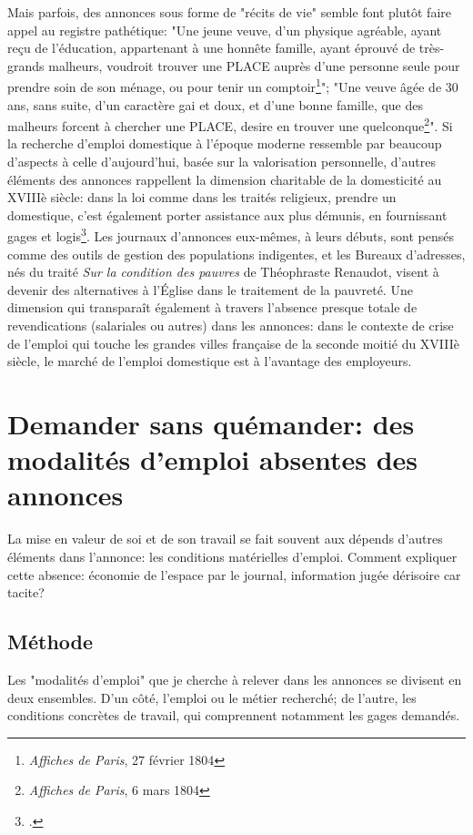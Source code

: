 {Mais parfois, des  annonces sous forme de "récits de vie" semble font plutôt faire appel au registre pathétique:  "Une jeune veuve, d'un physique agréable, ayant reçu de l'éducation, appartenant à une honnête famille, ayant éprouvé de très-grands malheurs, voudroit trouver une PLACE auprès d'une personne seule pour prendre soin de son ménage, ou pour tenir un comptoir\footnote{\textit{Affiches de Paris}, 27 février 1804}"; "Une veuve âgée de 30 ans, sans suite, d'un caractère gai et doux, et d'une bonne famille, que des malheurs forcent à chercher une PLACE, desire en trouver une quelconque\footnote{\textit{Affiches de Paris}, 6 mars 1804}". Si la recherche d'emploi domestique à l'époque moderne ressemble par beaucoup d'aspects à celle d'aujourd'hui, basée sur la valorisation personnelle, d'autres éléments des annonces rappellent la dimension charitable de la domesticité au XVIIIè siècle: dans la loi comme dans les traités religieux, prendre un domestique, c'est également porter assistance aux plus démunis, en fournissant gages et logis\footcites{sabattierChapitreMaitrePere1984}. Les journaux d'annonces eux-mêmes, à leurs débuts, sont pensés comme des outils de gestion des populations indigentes, et les Bureaux d'adresses, nés du traité \textit{Sur la condition des pauvres} de Théophraste Renaudot, visent à devenir des alternatives à l'Église dans le traitement de la pauvreté. Une dimension qui transparaît également à travers l'absence presque totale de revendications (salariales ou autres) dans les annonces: dans le contexte de crise de l'emploi qui touche les grandes villes française de la seconde moitié du XVIIIè siècle, le marché de l'emploi domestique est à l'avantage des employeurs.

\chapter{Demander sans quémander: des modalités d'emploi absentes des annonces}

La mise en valeur de soi et de son travail se fait souvent aux dépends d'autres éléments dans l'annonce: les conditions matérielles d'emploi. Comment expliquer cette absence: économie de l'espace par le journal, information jugée dérisoire car tacite? 


\section{Méthode}

Les "modalités d'emploi" que je cherche à relever dans les annonces se divisent en deux ensembles. D'un côté, l'emploi ou le métier recherché; de l'autre, les conditions concrètes de travail, qui comprennent notamment les gages demandés. 

}
